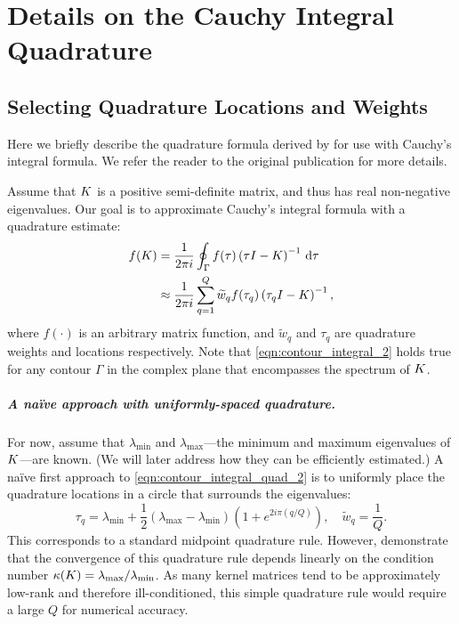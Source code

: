 \chapter{Details on the Cauchy Integral Quadrature}
\label{app:quadrature}

\section{Selecting Quadrature Locations and Weights}
Here we briefly describe the quadrature formula derived by \citet{hale2008computing} for use with Cauchy's integral formula.
We refer the reader to the original publication for more details.

Assume that $K$ is a positive semi-definite matrix, and thus has real non-negative eigenvalues.
Our goal is to approximate Cauchy's integral formula with a quadrature estimate:
%
\begin{align}
	f(K)
  &= \frac{1}{2 \pi i} \oint_\Gamma f(\tau) \left( \tau I - K \right)^{-1} \,\mathrm{d}{\tau}
  \label{eqn:contour_integral_2}
  \\
  &\approx
  \frac{1}{2 \pi i} \sum_{q=1}^Q \widetilde w_q f(\tau_q) \left( \tau_q I - K \right)^{-1},
  \label{eqn:contour_integral_quad_2}
\end{align}
%
where $f(\cdot)$ is an arbitrary matrix function, and $\widetilde w_q$ and $\tau_q$ are quadrature weights and locations respectively.
Note that \cref{eqn:contour_integral_2} holds true for any contour $\Gamma$ in the complex plane that encompasses the spectrum of $K$.

\paragraph{A na\"ive approach with uniformly-spaced quadrature.}
For now, assume that $\lambda_\text{min}$ and $\lambda_\text{max}$---the minimum and maximum eigenvalues of $K$---are known.
(We will later address how they can be efficiently estimated.)
A na\"ive first approach to \cref{eqn:contour_integral_quad_2} is to uniformly place the quadrature locations in a circle that surrounds the eigenvalues:
%
\[
  \tau_q = \lambda_\text{min} + \frac 1 2 \left( \lambda_\text{max} - \lambda_\text{min} \right) \left( 1 + e^{2 i \pi \left( q / Q \right)} \right),
  \quad
  \widetilde w_q = \frac 1 Q.
\]
%
This corresponds to a standard midpoint quadrature rule.
However, \citet{hale2008computing} demonstrate that the convergence of this quadrature rule depends linearly on the condition number $\kappa(K) = \lambda_\text{max} / \lambda_\text{min}$.
As many kernel matrices tend to be approximately low-rank and therefore ill-conditioned, this simple quadrature rule would require a large $Q$ for numerical accuracy.

